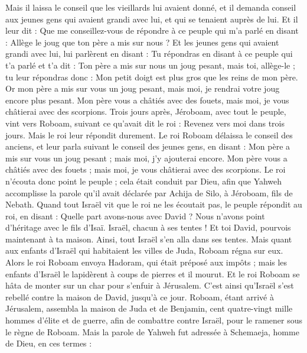 \begin{multicols}{2}
Mais il laissa le conseil que les vieillards lui avaient donné, et il demanda conseil aux jeunes gens qui avaient grandi avec lui, et qui se tenaient auprès de lui.
Et il leur dit : Que me conseillez-vous de répondre à ce peuple qui m'a parlé en disant : Allège le joug que ton père a mis sur nous ?
Et les jeunes gens qui avaient grandi avec lui, lui parlèrent en disant : Tu répondras en disant à ce peuple qui t'a parlé et t'a dit : Ton père a mis sur nous un joug pesant, mais toi, allège-le ; tu leur répondras donc : Mon petit doigt est plus gros que les reins de mon père.
Or mon père a mis sur vous un joug pesant, mais moi, je rendrai votre joug encore plus pesant. Mon père vous a châtiés avec des fouets, mais moi, je vous châtierai avec des scorpions.
Trois jours après, Jéroboam, avec tout le peuple, vint vers Roboam, suivant ce qu'avait dit le roi : Revenez vers moi dans trois jours.
Mais le roi leur répondit durement. Le roi Roboam délaissa le conseil des anciens,
et leur parla suivant le conseil des jeunes gens, en disant : Mon père a mis sur vous un joug pesant ; mais moi, j'y ajouterai encore. Mon père vous a châtiés avec des fouets ; mais moi, je vous châtierai avec des scorpions.
Le roi n'écouta donc point le peuple ; cela était conduit par Dieu, afin que Yahweh accomplisse la parole qu'il avait déclarée par Achija de Silo, à Jéroboam, fils de Nebath.
Quand tout Israël vit que le roi ne les écoutait pas, le peuple répondit au roi, en disant : Quelle part avons-nous avec David ? Nous n'avons point d'héritage avec le fils d'Isaï. Israël, chacun à ses tentes ! Et toi David, pourvois maintenant à ta maison. Ainsi, tout Israël s'en alla dans ses tentes.
Mais quant aux enfants d'Israël qui habitaient les villes de Juda, Roboam régna sur eux.
Alors le roi Roboam envoya Hadoram, qui était préposé aux impôts ; mais les enfants d'Israël le lapidèrent à coups de pierres et il mourut. Et le roi Roboam se hâta de monter sur un char pour s'enfuir à Jérusalem.
C'est ainsi qu'Israël s'est rebellé contre la maison de David, jusqu'à ce jour.
\VerseOne{}Roboam, étant arrivé à Jérusalem, assembla la maison de Juda et de Benjamin, cent quatre-vingt mille hommes d'élite et de guerre, afin de combattre contre Israël, pour le ramener sous le règne de Roboam.
Mais la parole de Yahweh fut adressée à Schemaeja, homme de Dieu, en ces termes :

\end{multicols}
